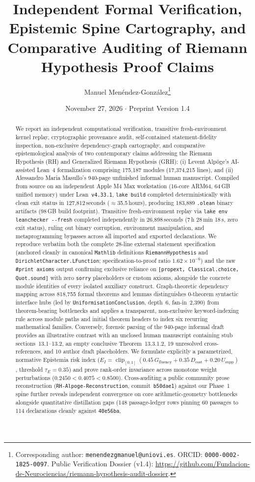\documentclass[11pt,a4paper]{article}
\title{\textbf{Independent Formal Verification, Epistemic Spine Cartography, and Comparative Auditing of Riemann Hypothesis Proof Claims}}
\author{Manuel Menéndez-González\thanks{Corresponding author: \texttt{menendezgmanuel@uniovi.es}. ORCID: \texttt{0000-0002-1825-0097}. Public Verification Dossier (v1.4): \url{https://github.com/Fundacion-de-Neurociencias/riemann-hypothesis-audit-dossier}.}}
\date{November 27, 2026 $\cdot$ Preprint Version 1.4}
\begin{document}
\maketitle
\thispagestyle{plain}

\begin{abstract}
\noindent We report an independent computational verification, transitive fresh-environment kernel replay, cryptographic provenance audit, self-contained statement-fidelity inspection, non-exclusive dependency-graph cartography, and comparative epistemological analysis of two contemporary claims addressing the Riemann Hypothesis (RH) and Generalized Riemann Hypothesis (GRH): (i) Levent Alp{\"o}ge's AI-assisted Lean~4 formalization comprising 175,187 modules (17,374,215 lines), and (ii) Alessandro Maria Masullo's 940-page unfinished informal human manuscript. Compiled from source on an independent Apple M4 Max workstation (16-core ARM64, 64\,GB unified memory) under Lean~\texttt{v4.33.1}, \texttt{lake build} completed deterministically with clean exit status in 127,812\,seconds ($\approx$35.5\,hours), producing 183,889 \texttt{.olean} binary artifacts (98\,GB build footprint). Transitive fresh-environment replay via \texttt{lake env leanchecker -{}-fresh} completed independently in 26,898\,seconds (7\,h 28\,min 18\,s, zero exit status), ruling out binary corruption, environment manipulation, and metaprogramming bypasses across all imported and exported declarations. We reproduce verbatim both the complete 28-line external statement specification (anchored cleanly in canonical \texttt{Mathlib} definitions \texttt{RiemannHypothesis} and \texttt{DirichletCharacter.LFunction}; specification-to-proof ratio $1.62 \times 10^{-6}$) and the raw \texttt{\#print axioms} output confirming exclusive reliance on \texttt{[propext, Classical.choice, Quot.sound]} with zero \texttt{sorry} placeholders or custom axioms, alongside the concrete module identities of every isolated auxiliary construct. Graph-theoretic dependency mapping across 818,755 formal theorems and lemmas distinguishes 0-theorem syntactic interface hubs (led by \texttt{UniformisationConclusion}, depth~6, fan-in~2,390) from theorem-bearing bottlenecks and applies a transparent, non-exclusive keyword-indexing rule across module paths and initial theorem headers to index six recurring mathematical families. Conversely, forensic parsing of the 940-page informal draft provides an illustrative contrast with an unclosed human manuscript containing stub sections~13.1--13.2, an empty conclusive Theorem~13.3.1.2, 19 unresolved cross-references, and 10 author draft placeholders. We formulate explicitly a parametrized, normative Epistemia risk index ($E_I = \operatorname{clip}_{[0,1]}(0.45\,G_{\mathrm{fluency}} + 0.35\,D_{\mathrm{cost}} + 0.20\,U_{\mathrm{supp}})$, threshold $\tau_E = 0.35$) and prove rank-order invariance across monotone weight perturbations ($0.2450 < 0.4075 < 0.8500$). Cross-auditing a public community prose reconstruction (\texttt{RH-Alpoge-Reconstruction}, commit~\texttt{b50dae1}) against our Phase~1 spine further reveals independent convergence on core arithmetic-geometry bottlenecks alongside quantitative distillation gaps (148 passage-ledger rows pinning 60 passages to 114 declarations cleanly against \texttt{40e56ba}, 
\end{abstract}
\end{document}

